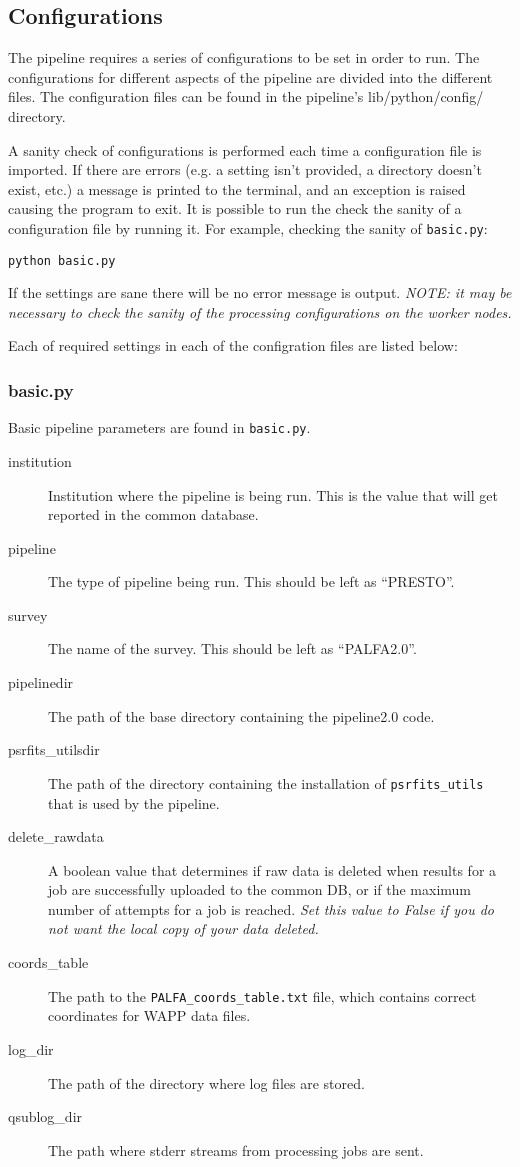 \subsection{Configurations}
\label{sec:configs}

The pipeline requires a series of configurations to be set in order to run. The configurations for different aspects of the pipeline are divided into the different files. The configuration files can be found in the pipeline's lib/python/config/ directory.

A sanity check of configurations is performed each time a configuration file is imported. If there are errors (e.g. a setting isn't provided, a directory doesn't exist, etc.) a message is printed to the terminal, and an exception is raised causing the program to exit. It is possible to run the check the sanity of a configuration file by running it. For example, checking the sanity of \texttt{basic.py}:

\texttt{python basic.py}

If the settings are sane there will be no error message is output. \textit{NOTE: it may be necessary to check the sanity of the processing configurations on the worker nodes.}

Each of required settings in each of the configration files are listed below:

\subsubsection{basic.py}
Basic pipeline parameters are found in \texttt{basic.py}.

\begin{description}
    \item[institution] Institution where the pipeline is being run. This is the value that will get reported in the common database.
    \item[pipeline] The type of pipeline being run. This should be left as ``PRESTO''.
    \item[survey] The name of the survey. This should be left as ``PALFA2.0''.
    \item[pipelinedir] The path of the base directory containing the pipeline2.0 code.
    \item[psrfits\_utilsdir] The path of the directory containing the installation of \texttt{psrfits\_utils} that is used by the pipeline.
    \item[delete\_rawdata] A boolean value that determines if raw data is deleted when results for a job are successfully uploaded to the common DB, or if the maximum number of attempts for a job is reached. \textit{Set this value to False if you do not want the local copy of your data deleted.}
    \item[coords\_table] The path to the \texttt{PALFA\_coords\_table.txt} file, which contains correct coordinates for WAPP data files.
    \item[log\_dir] The path of the directory where log files are stored.
    \item[qsublog\_dir] The path where stderr streams from processing jobs are sent.
\end{description}

